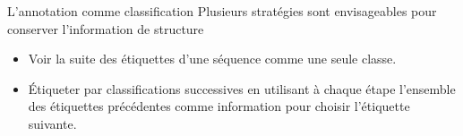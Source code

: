 \documentclass[hyperref={unicode}, xcolor={svgnames}, french]{beamer}
\begin{document}
\begin{frame}{L'annotation comme classification}
    Plusieurs stratégies sont envisageables pour conserver l'information de structure
    \begin{itemize}
        \item Voir la suite des étiquettes d'une séquence comme une seule classe.
        \item Étiqueter par classifications successives en utilisant à chaque étape l'ensemble des étiquettes précédentes comme information pour choisir l'étiquette suivante.
    \end{itemize}
\end{frame}




\end{document}
